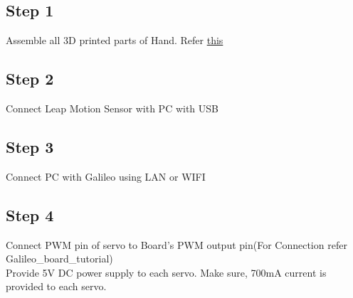 \documentclass[a4paper,12pt,oneside]{book}
\begin{document}
\subsection*{Step 1}
Assemble all 3D printed parts of Hand. Refer \href{http://inmoov.fr/hand-and-forarm/}{this}
\subsection*{Step 2}
Connect Leap Motion Sensor with PC with USB
\subsection*{Step 3}
Connect PC with Galileo using LAN or WIFI
\subsection*{Step 4}
Connect PWM pin of servo to Board's PWM output pin(For Connection refer Galileo\_board\_tutorial)\\
Provide 5V DC power supply to each servo. Make sure, 700mA current is provided to each servo.
\end{document}
